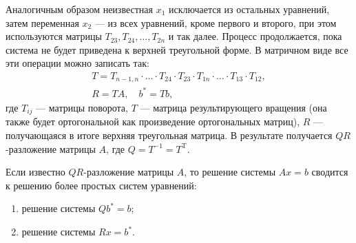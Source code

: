 \documentclass[12pt, a4paper]{article}
\begin{document}
	Аналогичным образом неизвестная $x_1$ исключается из остальных уравнений, затем переменная $x_2$ — из всех уравнений, кроме первого и второго, при этом используются матрицы $T_{23}, T_{24},\dots,T_{2n}$ и так далее. Процесс продолжается, пока система не будет приведена к верхней треугольной форме.
	В матричном виде все эти операции можно записать так:
	\[
	\begin{gathered}
		T=T_{n-1,n}\cdot \ldots \cdot T_{24} \cdot T_{23} \cdot T_{1n} \cdot \ldots \cdot T_{13} \cdot T_{12},\\
		R=TA,\quad b^*=Tb,
	\end{gathered}
	\]
	где $T_{ij}$ — матрицы поворота, $T$ — матрица результирующего
	вращения (она также будет ортогональной как произведение
	ортогональных матриц), $R$ — получающаяся в итоге верхняя
	треугольная матрица. В результате получается $QR$-разложение
	матрицы $A$, где $Q=T^{-1}=T^\text{T}$.
	
	Если известно $QR$-разложение матрицы $A$, то решение системы $Ax=b$ сводится к решению более простых систем уравнений:
	\begin{enumerate}
		\item решение системы  $Qb^*=b$;
		\item решение системы  $Rx=b^*$. 
	\end{enumerate}
	
	
	\newpage
\end{document}
